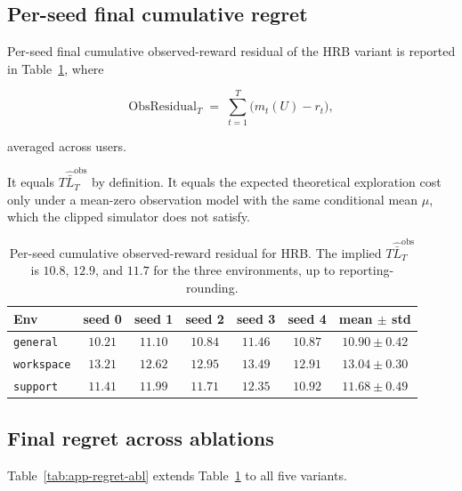 \documentclass{article} %
\begin{document}
\subsection{Per-seed final cumulative regret}

\label{app:tab-regret}

Per-seed final cumulative observed-reward residual of the \textnormal{HRB}
variant is reported in Table~\ref{tab:app-regret}, where

\begin{equation}
\label{eq:app-tab-regret}
\mathrm{ObsResidual}_T
\;=\;
\sum_{t=1}^T \big(m_t(U)-r_t\big),
\end{equation}

averaged across users.

It equals \(T\widehat{\bar L}_T^{\mathrm{obs}}\) by definition. It equals the
expected theoretical exploration cost only under a mean-zero observation model
with the same conditional mean \(\mu\), which the clipped simulator does not
satisfy.

\begin{table}[h]
\centering
\small
\caption{Per-seed cumulative observed-reward residual for HRB. The implied
\(T\widehat{\bar L}_T^{\mathrm{obs}}\) is \(10.8\), \(12.9\), and \(11.7\)
for the three environments, up to reporting-rounding.}
\label{tab:app-regret}
\begin{tabular}{lcccccc}
\toprule
Env & seed 0 & seed 1 & seed 2 & seed 3 & seed 4 & mean $\pm$ std \\
\midrule
\texttt{general}                 & $10.21$ & $11.10$ & $10.84$ & $11.46$ & $10.87$ & $10.90 \pm 0.42$ \\
\texttt{workspace}               & $13.21$ & $12.62$ & $12.95$ & $13.49$ & $12.91$ & $13.04 \pm 0.30$ \\
\texttt{support}                 & $11.41$ & $11.99$ & $11.71$ & $12.35$ & $10.92$ & $11.68 \pm 0.49$ \\
\bottomrule
\end{tabular}

\end{table}

\subsection{Final regret across ablations}

\label{app:tab-regret-ablation}

Table~\ref{tab:app-regret-abl} extends Table~\ref{tab:app-regret} to all five variants.
\end{document}
